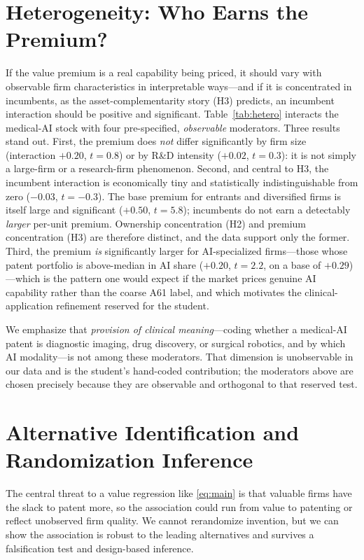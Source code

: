 \documentclass[12pt]{article}
\begin{document}
\section{Heterogeneity: Who Earns the Premium?}\label{sec:het}
If the value premium is a real capability being priced, it should vary with observable firm
characteristics in interpretable ways---and if it is concentrated in incumbents, as the
asset-complementarity story (H3) predicts, an incumbent interaction should be positive and
significant. Table~\ref{tab:hetero} interacts the medical-AI stock with four pre-specified,
\emph{observable} moderators. Three results stand out. First, the premium does \emph{not} differ
significantly by firm size (interaction $+0.20$, $t=0.8$) or by R\&D intensity ($+0.02$, $t=0.3$):
it is not simply a large-firm or a research-firm phenomenon. Second, and central to H3, the
incumbent interaction is economically tiny and statistically indistinguishable from zero
($-0.03$, $t=-0.3$). The base premium for entrants and diversified firms is itself large and
significant ($+0.50$, $t=5.8$); incumbents do not earn a detectably \emph{larger} per-unit
premium. Ownership concentration (H2) and premium concentration (H3) are therefore distinct, and
the data support only the former. Third, the premium \emph{is} significantly larger for
AI-specialized firms---those whose patent portfolio is above-median in AI share ($+0.20$,
$t=2.2$, on a base of $+0.29$)---which is the pattern one would expect if the market prices genuine
AI capability rather than the coarse A61 label, and which motivates the clinical-application
refinement reserved for the student.

We emphasize that \emph{provision of clinical meaning}---coding whether a medical-AI patent is
diagnostic imaging, drug discovery, or surgical robotics, and by which AI modality---is not among
these moderators. That dimension is unobservable in our data and is the student's hand-coded
contribution; the moderators above are chosen precisely because they are observable and orthogonal
to that reserved test.

\section{Alternative Identification and Randomization Inference}\label{sec:robust}
The central threat to a value regression like \eqref{eq:main} is that valuable firms have the
slack to patent more, so the association could run from value to patenting or reflect unobserved
firm quality. We cannot rerandomize invention, but we can show the association is robust to the
leading alternatives and survives a falsification test and design-based inference.
\end{document}
